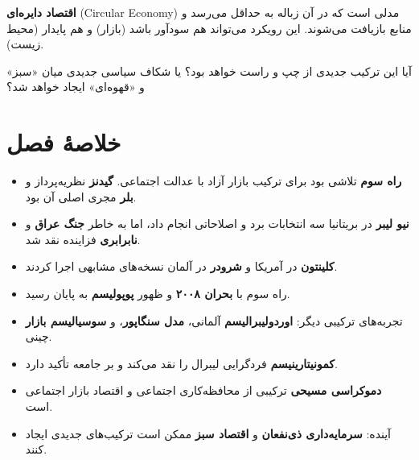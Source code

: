 \textbf{اقتصاد دایره‌ای} (Circular Economy) مدلی است که در آن زباله به حداقل می‌رسد و منابع بازیافت می‌شوند. این رویکرد می‌تواند هم سودآور باشد (بازار) و هم پایدار (محیط زیست).

آیا این ترکیب جدیدی از چپ و راست خواهد بود؟ یا شکاف سیاسی جدیدی میان «سبز» و «قهوه‌ای» ایجاد خواهد شد؟


\section*{خلاصهٔ فصل}

\begin{tcolorbox}[
    enhanced,
    colback=lightbg,
    colframe=darkgray,
    boxrule=2pt,
    arc=8pt,
    fonttitle=\bfseries\large,
    title={\rl{📝 خلاصهٔ فصل پانزدهم}}
]
\begin{itemize}
    \item \textbf{راه سوم} تلاشی بود برای ترکیب بازار آزاد با عدالت اجتماعی. \textbf{گیدنز} نظریه‌پرداز و \textbf{بلر} مجری اصلی آن بود.
    
    \item \textbf{نیو لیبر} در بریتانیا سه انتخابات برد و اصلاحاتی انجام داد، اما به خاطر \textbf{جنگ عراق} و \textbf{نابرابری} فزاینده نقد شد.
    
    \item \textbf{کلینتون} در آمریکا و \textbf{شرودر} در آلمان نسخه‌های مشابهی اجرا کردند.
    
    \item راه سوم با \textbf{بحران ۲۰۰۸} و ظهور \textbf{پوپولیسم} به پایان رسید.
    
    \item تجربه‌های ترکیبی دیگر: \textbf{اوردولیبرالیسم} آلمانی، \textbf{مدل سنگاپور}، و \textbf{سوسیالیسم بازار} چینی.
    
    \item \textbf{کمونیتارینیسم} فردگرایی لیبرال را نقد می‌کند و بر جامعه تأکید دارد.
    
    \item \textbf{دموکراسی مسیحی} ترکیبی از محافظه‌کاری اجتماعی و اقتصاد بازار اجتماعی است.
    
    \item آینده: \textbf{سرمایه‌داری ذی‌نفعان} و \textbf{اقتصاد سبز} ممکن است ترکیب‌های جدیدی ایجاد کنند.
\end{itemize}
\end{tcolorbox}

